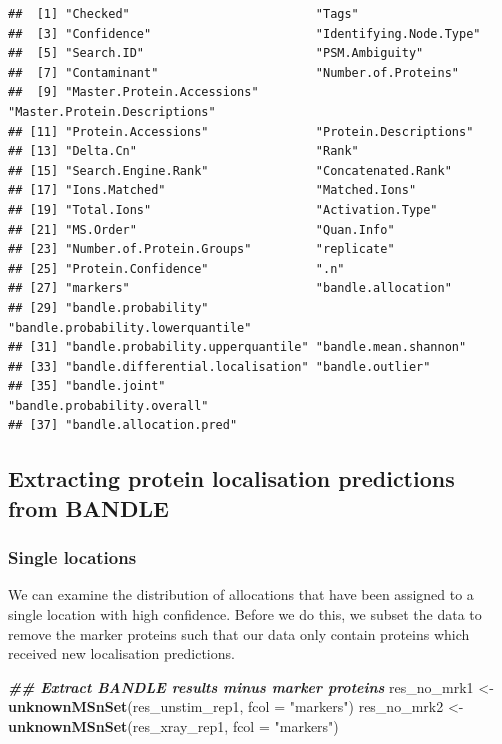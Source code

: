 \documentclass[9pt,a4paper,]{extarticle}
\newenvironment{Shaded}{\begin{snugshade}}{\end{snugshade}}
\newcommand{\AttributeTok}[1]{\textcolor[rgb]{0.13,0.29,0.53}{#1}}
\newcommand{\DocumentationTok}[1]{\textcolor[rgb]{0.56,0.35,0.01}{\textbf{\textit{#1}}}}
\newcommand{\FunctionTok}[1]{\textcolor[rgb]{0.13,0.29,0.53}{\textbf{#1}}}
\newcommand{\NormalTok}[1]{#1}
\newcommand{\OtherTok}[1]{\textcolor[rgb]{0.56,0.35,0.01}{#1}}
\newcommand{\StringTok}[1]{\textcolor[rgb]{0.31,0.60,0.02}{#1}}
\begin{document}
\begin{verbatim}
##  [1] "Checked"                          "Tags"                            
##  [3] "Confidence"                       "Identifying.Node.Type"           
##  [5] "Search.ID"                        "PSM.Ambiguity"                   
##  [7] "Contaminant"                      "Number.of.Proteins"              
##  [9] "Master.Protein.Accessions"        "Master.Protein.Descriptions"     
## [11] "Protein.Accessions"               "Protein.Descriptions"            
## [13] "Delta.Cn"                         "Rank"                            
## [15] "Search.Engine.Rank"               "Concatenated.Rank"               
## [17] "Ions.Matched"                     "Matched.Ions"                    
## [19] "Total.Ions"                       "Activation.Type"                 
## [21] "MS.Order"                         "Quan.Info"                       
## [23] "Number.of.Protein.Groups"         "replicate"                       
## [25] "Protein.Confidence"               ".n"                              
## [27] "markers"                          "bandle.allocation"               
## [29] "bandle.probability"               "bandle.probability.lowerquantile"
## [31] "bandle.probability.upperquantile" "bandle.mean.shannon"             
## [33] "bandle.differential.localisation" "bandle.outlier"                  
## [35] "bandle.joint"                     "bandle.probability.overall"      
## [37] "bandle.allocation.pred"
\end{verbatim}

\subsection{Extracting protein localisation predictions from BANDLE}\label{extracting-protein-localisation-predictions-from-bandle}

\subsubsection{Single locations}\label{single-locations}

We can examine the distribution of allocations that have been assigned to a
single location with high confidence. Before we do this, we subset the data to
remove the marker proteins such that our data only contain proteins which
received new localisation predictions.

\begin{Shaded}
\begin{Highlighting}[]
\DocumentationTok{\#\# Extract BANDLE results minus marker proteins}
\NormalTok{res\_no\_mrk1 }\OtherTok{\textless{}{-}} \FunctionTok{unknownMSnSet}\NormalTok{(res\_unstim\_rep1, }\AttributeTok{fcol =} \StringTok{"markers"}\NormalTok{)}
\NormalTok{res\_no\_mrk2 }\OtherTok{\textless{}{-}} \FunctionTok{unknownMSnSet}\NormalTok{(res\_xray\_rep1, }\AttributeTok{fcol =} \StringTok{"markers"}\NormalTok{) }
\end{Highlighting}
\end{Shaded}
\end{document}
